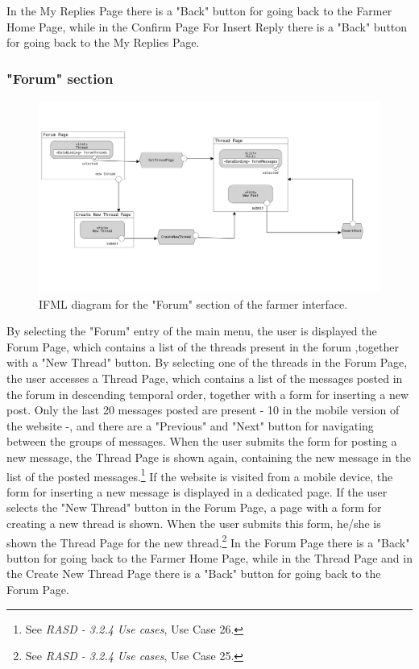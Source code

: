 \documentclass{article}
\begin{document}
In the My Replies Page there is a "Back" button for going back to the Farmer Home Page, while in the Confirm Page For Insert Reply there is a "Back" button for going back to the My Replies Page.

\subsubsection{"Forum" section}
\begin{figure}[H]
    \centering
     \includegraphics[scale=0.15]{diagrams/ui diagrams/farmer/forum.png} 
    \caption{IFML diagram for the "Forum" section of the farmer interface.}
\end{figure}
By selecting the "Forum" entry of the main menu, the user is displayed the Forum Page, which contains a list of the threads present in the forum ,together with a "New Thread" button. \newline
By selecting one of the threads in the Forum Page, the user accesses a Thread Page, which contains a list of the messages posted in the forum in descending temporal order, together with a form for inserting a new post. Only the last 20 messages posted are present - 10 in the mobile version of the website -, and there are a "Previous" and "Next" button for navigating between the groups of messages. When the user submits the form for posting a new message, the Thread Page is shown again, containing the new message in the list of the posted messages.\footnote{See \textit{RASD - 3.2.4 Use cases}, Use Case 26.} If the website is visited from a mobile device, the form for inserting a new message is displayed in a dedicated page.\newline
If the user selects the "New Thread" button in the Forum Page, a page with a form for creating a new thread is shown. When the user submits this form, he/she is shown the Thread Page for the new thread.\footnote{See \textit{RASD - 3.2.4 Use cases}, Use Case 25.} \newline
In the Forum Page there is a "Back" button for going back to the Farmer Home Page, while in the Thread Page and in the Create New Thread Page there is a "Back" button for going back to the Forum Page.
\end{document}
